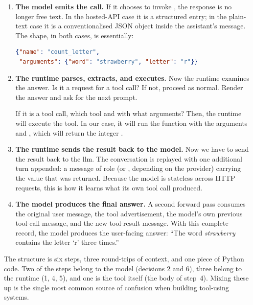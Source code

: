 \begin{enumerate}[label=\textbf{Step \arabic*.},leftmargin=2.3em,itemsep=0.4em]
  \item \textbf{The model emits the call.} If it chooses to invoke
  , the response is no longer free text. In the
  hosted-API case it is a structured  entry; in the
  plain-text case it is a conventionalised JSON object inside the
  assistant's message. The shape, in both cases, is essentially:

\begin{lstlisting}[language=json]
{"name": "count_letter",
 "arguments": {"word": "strawberry", "letter": "r"}}
\end{lstlisting}

\item \textbf{The runtime parses, extracts, and executes.} 
 Now the runtime examines the answer. Is it a request for a tool call? If not,
 proceed as normal. Render the answer and ask for the next prompt. 
 
 If it is a tool call, which tool and with what arguments? Then, the runtime
 will execute the tool. In our case, it will run the  
 function with the arguments  and , 
 which will return the integer .

\item \textbf{The runtime sends the result back to the model.} Now we 
have to send the result back to the llm. The
  conversation is replayed with one additional turn appended: a
  message of role  (or , depending on
  the provider) carrying the value that was returned. Because the
  model is stateless across HTTP requests, this is how it learns
  what its own tool call produced.

\item \textbf{The model produces the final answer.} A second forward
  pass consumes the original user message, the tool advertisement,
  the model's own previous tool-call message, and the new tool-result
  message. With this complete record, the model produces the
  user-facing answer: ``The word \emph{strawberry} contains the
  letter `r' three times.''

\end{enumerate}

\noindent
The structure is six steps, three round-trips of context, and one
piece of Python code. Two of the steps belong to the model
(decisions 2 and 6), three belong to the runtime (1, 4, 5), and one
is the tool itself (the body of step~4). Mixing these up is the
single most common source of confusion when building tool-using
systems.

